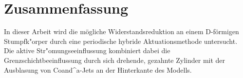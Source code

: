 \chapter*{Zusammenfassung}\label{s:uebersicht}

In dieser Arbeit wird die mögliche Widerstandsreduktion an einem D-förmigen Stumpfk"orper durch eine periodische hybride Aktuationsmethode untersucht.
Die aktive Str"omungseeinflussung kombiniert dabei die Grenzschichtbeeinflussung durch sich drehende, gezahnte Zylinder mit der Ausblasung von Coand^{a}-Jets an der Hinterkante des Modells.


